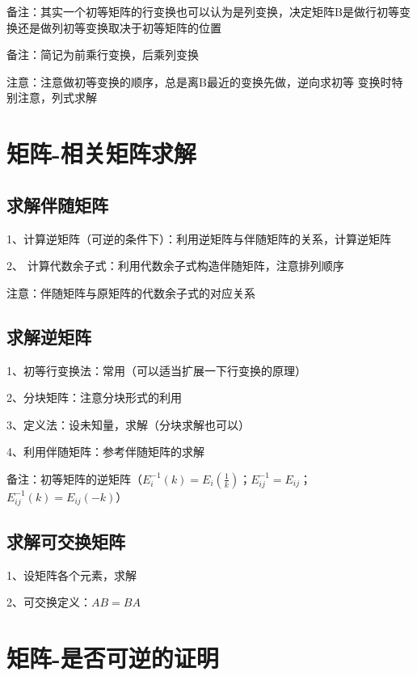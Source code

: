 备注：其实一个初等矩阵的行变换也可以认为是列变换，决定矩阵B是做行初等变换还是做列初等变换取决于初等矩阵的位置

备注：简记为前乘行变换，后乘列变换

注意：注意做初等变换的顺序，总是离B最近的变换先做，逆向求初等 变换时特别注意，列式求解

\section{矩阵-相关矩阵求解}



\subsection{求解伴随矩阵}

1、计算逆矩阵（可逆的条件下）：利用逆矩阵与伴随矩阵的关系，计算逆矩阵

2、 计算代数余子式：利用代数余子式构造伴随矩阵，注意排列顺序

注意：伴随矩阵与原矩阵的代数余子式的对应关系



\subsection{求解逆矩阵}

1、初等行变换法：常用（可以适当扩展一下行变换的原理）

2、分块矩阵：注意分块形式的利用

3、定义法：设未知量，求解（分块求解也可以）

4、利用伴随矩阵：参考伴随矩阵的求解

备注：初等矩阵的逆矩阵（$E_{i}^{-1}(k)=E_{i}(\frac 1 k)$；$E_{ij}^{-1}=E_{ij}$；$E_{ij}^{-1}(k)=E_{ij}(-k)$）



\subsection{求解可交换矩阵}

1、设矩阵各个元素，求解

2、可交换定义：$AB=BA$

\section{矩阵-是否可逆的证明}




